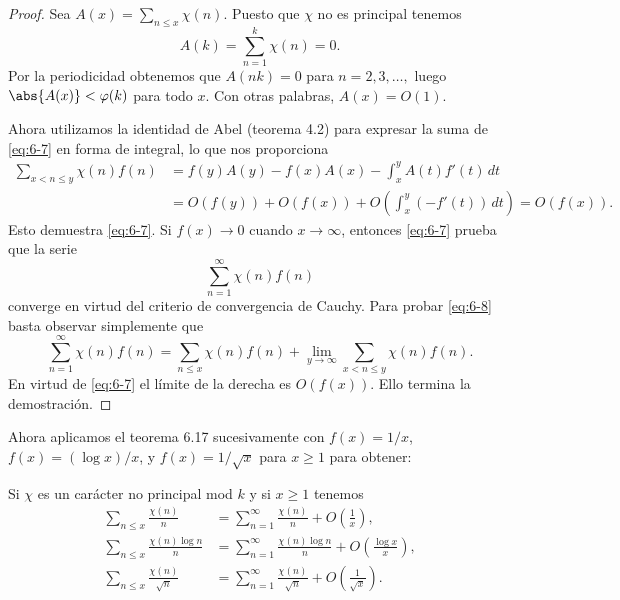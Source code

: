 \documentclass[12pt,a4paper]{book}
\begin{document}
    \begin{proof}
        Sea $A(x)=\sum_{n\leq x}\chi(n)$. Puesto que $\chi$ no es principal tenemos
        \begin{equation*}
            A(k)=\sum_{n=1}^{k}\chi(n)=0.
        \end{equation*}
        Por la periodicidad obtenemos que $A(nk)=0$ para $n=2,3,\dots,$ luego
        $\abs{A(x)}<\varphi(k)$ para todo $x$. Con otras palabras, $A(x)=O(1)$.

        Ahora utilizamos la identidad de Abel (teorema 4.2) para expresar la suma de
        \eqref{eq:6-7} en forma de integral, lo que nos proporciona
        \begin{align*}
            \sum_{x<n\leq y}\chi(n)f(n)&=f(y)A(y)-f(x)A(x)-\int_{x}^{y}A(t)f'(t)\,dt\\
            &=O(f(y))+O(f(x))+O\left(\int_{x}^{y}(-f'(t))\,dt\right)=O(f(x)).
        \end{align*}
        Esto demuestra \eqref{eq:6-7}. Si $f(x)\to0$ cuando $x\to\infty$, entonces
        \eqref{eq:6-7} prueba que la serie
        \begin{equation*}
            \sum_{n=1}^{\infty}\chi(n)f(n)
        \end{equation*}
        converge en virtud del criterio de convergencia de Cauchy. Para probar
        \eqref{eq:6-8} basta observar simplemente que
        \begin{equation*}
            \sum_{n=1}^{\infty}\chi(n)f(n)=\sum_{n\leq x}\chi(n)f(n)
            +\lim_{y\to\infty}\sum_{x<n\leq y}\chi(n)f(n).
        \end{equation*}
        En virtud de \eqref{eq:6-7} el límite de la derecha es $O(f(x))$. Ello termina la
        demostración.
    \end{proof}

    Ahora aplicamos el teorema 6.17 sucesivamente con $f(x)=1/x$, $f(x)=(\log x)/x$, y
    $f(x)=1/\sqrt{x}$ para $x\geq1$ para obtener:

    \begin{teorema}
        Si $\chi$ es un carácter no principal mod $k$ y si $x\geq1$ tenemos
        \begin{align}
            \sum_{n\leq x}\frac{\chi(n)}{n}&=\sum_{n=1}^{\infty}\frac{\chi(n)}{n}
            +O\left(\frac{1}{x}\right),\label{eq:6-9}\\
            \sum_{n\leq x}\frac{\chi(n)\log n}{n}&=\sum_{n=1}^{\infty}
            \frac{\chi(n)\log n}{n}+O\left(\frac{\log x}{x}\right),\label{eq:6-10}\\
            \sum_{n\leq x}\frac{\chi(n)}{\sqrt{n}}&=\sum_{n=1}^{\infty}
            \frac{\chi(n)}{\sqrt{n}}+O\left(\frac{1}{\sqrt{x}}\right).\label{eq:6-11}
        \end{align}
    \end{teorema}
\end{document}
